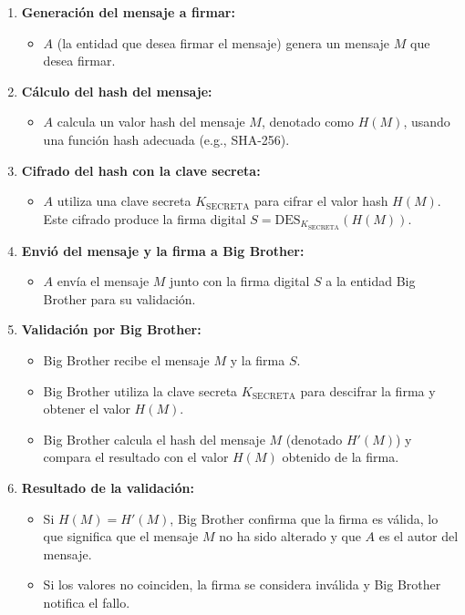 \documentclass[12pt]{article}
\begin{document}
\begin{enumerate}
    \item \textbf{Generación del mensaje a firmar:}
    \begin{itemize}
        \item \(A\) (la entidad que desea firmar el mensaje) genera un mensaje \(M\) que desea firmar.
    \end{itemize}

    \item \textbf{Cálculo del hash del mensaje:}
    \begin{itemize}
        \item \(A\) calcula un valor hash del mensaje \(M\), denotado como \(H(M)\), usando una función hash adecuada (e.g., SHA-256).
    \end{itemize}

    \item \textbf{Cifrado del hash con la clave secreta:}
    \begin{itemize}
        \item \(A\) utiliza una clave secreta \(K_{\text{SECRETA}}\) para cifrar el valor hash \(H(M)\). Este cifrado produce la firma digital \(S = \text{DES}_{K_{\text{SECRETA}}}(H(M))\).
    \end{itemize}

    \item \textbf{Envió del mensaje y la firma a Big Brother:}
    \begin{itemize}
        \item \(A\) envía el mensaje \(M\) junto con la firma digital \(S\) a la entidad Big Brother para su validación.
    \end{itemize}

    \item \textbf{Validación por Big Brother:}
    \begin{itemize}
        \item Big Brother recibe el mensaje \(M\) y la firma \(S\).
        \item Big Brother utiliza la clave secreta \(K_{\text{SECRETA}}\) para descifrar la firma y obtener el valor \(H(M)\).
        \item Big Brother calcula el hash del mensaje \(M\) (denotado \(H'(M)\)) y compara el resultado con el valor \(H(M)\) obtenido de la firma.
    \end{itemize}

    \item \textbf{Resultado de la validación:}
    \begin{itemize}
        \item Si \(H(M) = H'(M)\), Big Brother confirma que la firma es válida, lo que significa que el mensaje \(M\) no ha sido alterado y que \(A\) es el autor del mensaje.
        \item Si los valores no coinciden, la firma se considera inválida y Big Brother notifica el fallo.
    \end{itemize}
\end{enumerate}
\end{document}

